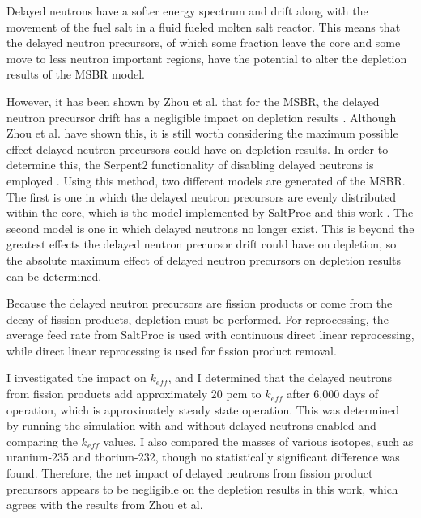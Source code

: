 Delayed neutrons have a softer energy spectrum and drift along with the movement of the fuel salt in a fluid fueled molten salt reactor. This means that the delayed neutron precursors, of which some fraction leave the core and some move to less neutron important regions, have the potential to alter the depletion results of the MSBR model.

However, it has been shown by Zhou et al. that for the MSBR, the delayed neutron precursor drift has a negligible impact on depletion results \cite{zhou_fuel_2018}. Although Zhou et al. have shown this, it is still worth considering the maximum possible effect delayed neutron precursors could have on depletion results. In order to determine this, the Serpent2 functionality of disabling delayed neutrons is employed \cite{leppanen_serpent_2015}. Using this method, two different models are generated of the MSBR. The first is one in which the delayed neutron precursors are evenly distributed within the core, which is the model implemented by SaltProc and this work \cite{rykhlevskii_modeling_2019}. The second model is one in which delayed neutrons no longer exist. This is beyond the greatest effects the delayed neutron precursor drift could have on depletion, so the absolute maximum effect of delayed neutron precursors on depletion results can be determined.

Because the delayed neutron precursors are fission products or come from the decay of fission products, depletion must be performed. For reprocessing, the average feed rate from SaltProc is used with continuous direct linear reprocessing, while direct linear reprocessing is used for fission product removal. 

I investigated the impact on $k_{eff}$, and I determined that the delayed neutrons from fission products add approximately 20 pcm to $k_{eff}$ after 6,000 days of operation, which is approximately steady state operation. 
This was determined by running the simulation with and without delayed neutrons enabled and comparing the $k_{eff}$ values.
I also compared the masses of various isotopes, such as uranium-235 and thorium-232, though no statistically significant difference was found. Therefore, the net impact of delayed neutrons from fission product precursors appears to be negligible on the depletion results in this work, which agrees with the results from Zhou et al.


